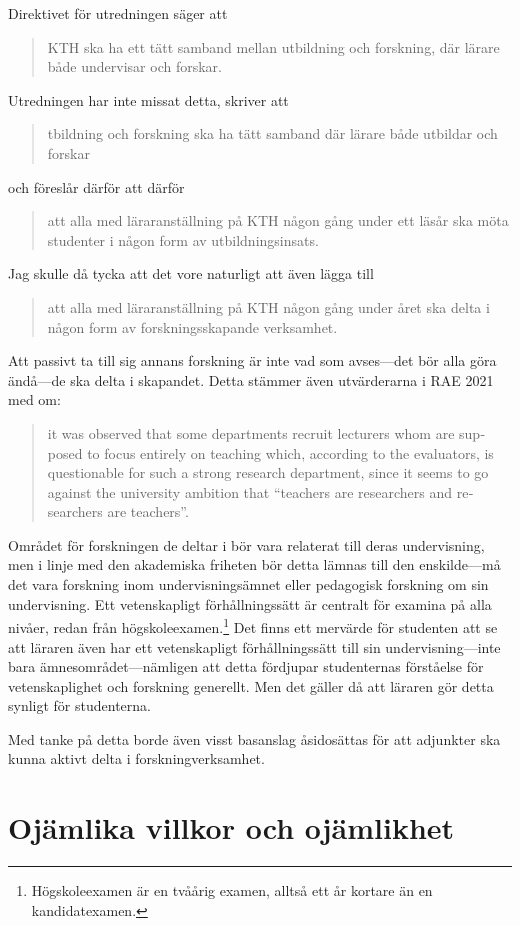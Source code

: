 \documentclass[a4paper,oneside,article,swedish]{memoir}
\let\section\chapter
\begin{document}
Direktivet för utredningen säger att
\blockcquote[s.~1]{direktiv}{%
  KTH ska ha ett tätt samband mellan utbildning och forskning, där lärare både 
  undervisar och forskar.%
}
Utredningen har inte missat detta, \textcite{utredning} skriver att
\blockcquote[s.~2]{utredning}{%
  tbildning och forskning ska ha tätt samband där lärare både 
  utbildar och forskar%
}
och föreslår därför att därför
\blockcquote[s-~2]{utredning}{%
  att alla med läraranställning på KTH någon gång under ett läsår ska möta 
  studenter i någon form av utbildningsinsats.%
}

Jag skulle då tycka att det vore naturligt att även lägga till
\blockquote{%
  att alla med läraranställning på KTH någon gång under året ska delta i någon 
  form av forskningsskapande verksamhet.%
}
Att passivt ta till sig annans forskning är inte vad som avses---det bör alla 
göra ändå---de ska delta i skapandet.
Detta stämmer även utvärderarna i RAE 2021 med om:
\blockcquote[s.~19]{RAE2021}{\foreignlanguage{english}{%
  it was observed
  that some departments recruit lecturers whom are supposed
  to focus entirely on teaching which, according to the evaluators, is 
  questionable for such a strong research department,
  since it seems to go against the university ambition that
  \enquote{teachers are researchers and researchers are teachers}.%
}}
Området för forskningen de deltar i bör vara relaterat till deras undervisning, 
men i linje med den akademiska friheten bör detta lämnas till den enskilde---må 
det vara forskning inom undervisningsämnet eller pedagogisk forskning om sin 
undervisning.
Ett vetenskapligt förhållningssätt är centralt för examina på alla nivåer, 
redan från högskoleexamen.\footnote{%
  Högskoleexamen är en tvåårig examen, alltså ett år kortare än en 
  kandidatexamen.
}\autocite[bilaga 2]{Högskoleförordningen}
Det finns ett mervärde för studenten att se att läraren även har ett 
vetenskapligt förhållningssätt till sin undervisning---inte bara 
ämnesområdet---nämligen att detta fördjupar studenternas förståelse för 
vetenskaplighet och forskning generellt\autocite{NCOL}.
Men det gäller då att läraren gör detta synligt för studenterna.

Med tanke på detta borde även visst basanslag åsidosättas för att adjunkter ska 
kunna aktivt delta i forskningverksamhet.


\section{Ojämlika villkor och 
ojämlikhet}\label{ForskandeAdjunkter}\label{OjämlikaVillkor}
\end{document}
